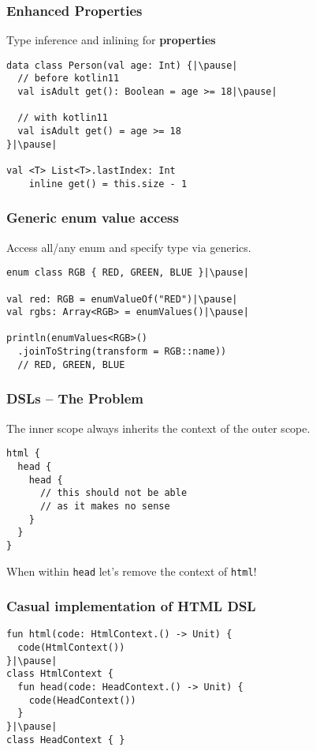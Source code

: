 
\begin{frame}[fragile] \frametitle{Enhanced Properties}
Type inference and inlining for \textbf{properties} %
\begin{lstlisting}
data class Person(val age: Int) {|\pause|
  // before kotlin11
  val isAdult get(): Boolean = age >= 18|\pause|

  // with kotlin11
  val isAdult get() = age >= 18
}|\pause|

val <T> List<T>.lastIndex: Int
    inline get() = this.size - 1
\end{lstlisting}
\end{frame}


\begin{frame}[fragile] \frametitle{Generic enum value access}
Access all/any enum and specify type via generics.
\begin{lstlisting}
enum class RGB { RED, GREEN, BLUE }|\pause|

val red: RGB = enumValueOf("RED")|\pause|
val rgbs: Array<RGB> = enumValues()|\pause|

println(enumValues<RGB>()
  .joinToString(transform = RGB::name))
  // RED, GREEN, BLUE
\end{lstlisting}
\end{frame}


\begin{frame}[fragile] \frametitle{DSLs -- The Problem}
The inner scope always inherits the context of the outer scope.\pause
\begin{lstlisting}
html {
  head {
    head {
      // this should not be able
      // as it makes no sense
    }
  }
}
\end{lstlisting}\pause
When within \texttt{head} let's remove the context of \texttt{html}!
\end{frame}


\begin{frame}[fragile] \frametitle{Casual implementation of HTML DSL}
\begin{lstlisting}
fun html(code: HtmlContext.() -> Unit) {
  code(HtmlContext())
}|\pause|
class HtmlContext {
  fun head(code: HeadContext.() -> Unit) {
    code(HeadContext())
  }
}|\pause|
class HeadContext { }
\end{lstlisting}
\end{frame}



